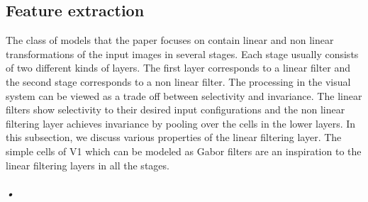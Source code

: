\documentclass[12pt,twoside]{article}
\theoremstyle{plain}
\theoremstyle{definition}
\theoremstyle{remark}
\begin{document}
\subsection{Feature extraction}
\label{Subsec: Feature}
The class of models that the paper focuses on contain linear and non linear transformations of the input images in several stages. Each stage usually consists of two different kinds of layers. The first layer corresponds to a linear filter and the second stage corresponds to a non linear filter. The processing in the visual system can be viewed as a trade off between selectivity and invariance. The linear filters show selectivity to their desired input configurations and the non linear filtering layer achieves invariance by pooling over the cells in the lower layers. In this subsection, we discuss various properties of the linear filtering layer. The simple cells of V1 which can be modeled as Gabor filters are an inspiration to the linear filtering layers in all the stages. 
\subparagraph{•}
\end{document}
